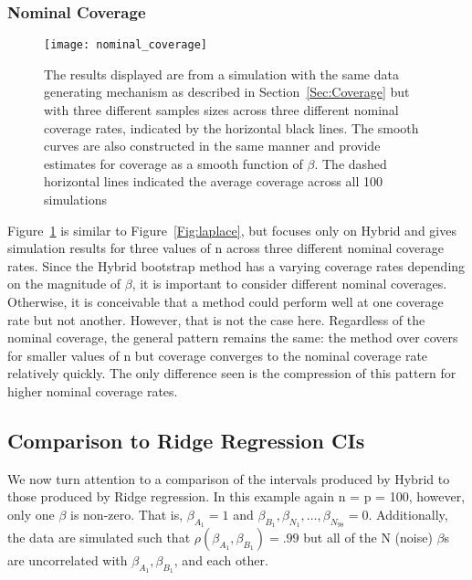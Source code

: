 \subsubsection{Nominal Coverage}

\begin{figure}[hbtp]
  \begin{center}
  \texttt{[image: nominal\_coverage]}
  \caption{\label{Fig:nominal_coverage}  The results displayed are from a simulation with the same data generating mechanism as described in Section~\ref{Sec:Coverage} but with three different samples sizes across three different nominal coverage rates, indicated by the horizontal black lines. The smooth curves are also constructed in the same manner and provide estimates for coverage as a smooth function of $\beta$. The dashed horizontal lines indicated the average coverage across all 100 simulations}
  \end{center}
\end{figure} 

Figure~\ref{Fig:nominal_coverage} is similar to Figure~\ref{Fig:laplace}, but focuses only on Hybrid and gives simulation results for three values of n across three different nominal coverage rates. Since the Hybrid bootstrap method has a varying coverage rates depending on the magnitude of $\beta$, it is important to consider different nominal coverages. Otherwise, it is conceivable that a method could perform well at one coverage rate but not another. However, that is not the case here. Regardless of the nominal coverage, the general pattern remains the same: the method over covers for smaller values of n but coverage converges to the nominal coverage rate relatively quickly. The only difference seen is the compression of this pattern for higher nominal coverage rates.
\subsection{Comparison to Ridge Regression CIs}\label{Sec:Ridge}

We now turn attention to a comparison of the intervals produced by Hybrid to those produced by Ridge regression. In this example again n = p = 100, however, only one $\beta$ is non-zero. That is, $\beta_{A_1} = 1$ and $\beta_{B_1}, \beta_{N_1}, \ldots, \beta_{N_{98}} = 0$. Additionally, the data are simulated such that $\rho(\beta_{A_1}, \beta_{B_1}) = .99$ but all of the N (noise) $\beta$s are uncorrelated with $\beta_{A_1}, \beta_{B_1}$, and each other.

